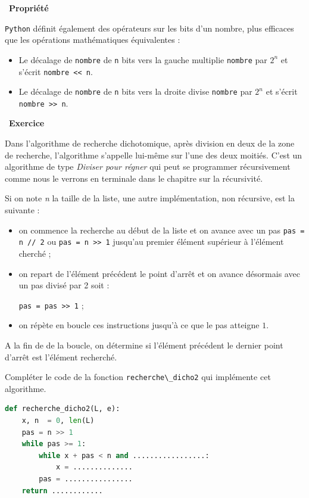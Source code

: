 \documentclass[
  11pt,
]{article}
\newcommand{\passthrough}[1]{#1}
\newcounter{exo}
\newenvironment{exercice}[1]
{\par \medskip   \addtocounter{exo}{1} \noindent  
\begin{bclogo}[arrondi =0.1,   noborder = true, logo=\bccrayon, marge=4]{~\textbf{Exercice} \textbf{\theexo} {\itshape #1} }  \par}
{
\end{bclogo}
 \par \bigskip }
\newcounter{thme}
\newcounter{prop}
\newenvironment{propriete}[1]
{\par \medskip   \addtocounter{prop}{1} \noindent  
\begin{bclogo}[arrondi =0.1,  ombre = true, barre=none, logo=\bcbook, marge=4]{~\textbf{Propriété} \textbf{\theprop} {\itshape #1} }   \par}
{
\end{bclogo}
 \par \bigskip }
\newcounter{def}
\newcounter{alg}
\newcounter{prog}
\begin{document}
\begin{propriete}{}

\passthrough{\lstinline!Python!} définit également des opérateurs sur
les bits d'un nombre, plus efficaces que les opérations mathématiques
équivalentes :

\begin{itemize}
\item
  Le décalage de \passthrough{\lstinline!nombre!} de
  \passthrough{\lstinline!n!} bits vers la gauche multiplie
  \passthrough{\lstinline!nombre!} par \(2^{n}\) et s'écrit
  \passthrough{\lstinline!nombre << n!}.
\item
  Le décalage de \passthrough{\lstinline!nombre!} de
  \passthrough{\lstinline!n!} bits vers la droite divise
  \passthrough{\lstinline!nombre!} par \(2^{n}\) et s'écrit
  \passthrough{\lstinline!nombre >> n!}.
\end{itemize}

\end{propriete}

\begin{exercice}{}

Dans l'algorithme de recherche dichotomique, après division en deux de
la zone de recherche, l'algorithme s'appelle lui-même sur l'une des deux
moitiés. C'est un algorithme de type \emph{Diviser pour régner} qui peut
se programmer récursivement comme nous le verrons en terminale dans le
chapitre sur la récursivité.

Si on note \emph{n} la taille de la liste, une autre implémentation, non
récursive, est la suivante :

\begin{itemize}
\item
  on commence la recherche au début de la liste et on avance avec un pas
  \passthrough{\lstinline!pas = n // 2!} ou
  \passthrough{\lstinline!pas = n >> 1!} jusqu'au premier élément
  supérieur à l'élément cherché ;
\item
  on repart de l'élément précédent le point d'arrêt et on avance
  désormais avec un pas divisé par 2 soit :

  \passthrough{\lstinline!pas = pas >> 1!} ;
\item
  on répète en boucle ces instructions jusqu'à ce que le pas atteigne
  \(1\).
\end{itemize}

A la fin de de la boucle, on détermine si l'élément précédent le dernier
point d'arrêt est l'élément recherché.

Compléter le code de la fonction
\passthrough{\lstinline!recherche\_dicho2!} qui implémente cet
algorithme.

\begin{lstlisting}[language=Python]
def recherche_dicho2(L, e):
    x, n  = 0, len(L)
    pas = n >> 1
    while pas >= 1:
        while x + pas < n and .................:
            x = ..............
        pas = ................
    return ............
\end{lstlisting}

\end{exercice}
\end{document}
